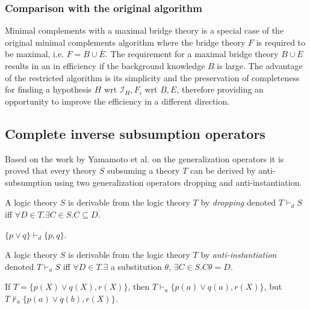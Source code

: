 \subsubsection{Comparison with the original algorithm}\label{inverse_subsumption_algorithm_comparison}
Minimal complements with a maximal bridge theory is a special case of the original minimal complements algorithm where the bridge theory $F$ is required to be maximal, i.e. $F=B \cup \overline{E}$. The requirement for a maximal bridge theory $B \cup \overline{E}$ results in an in efficiency if the background knowledge $B$ is large. The advantage of the restricted algorithm is its simplicity and the preservation of completeness for finding a hypothesis $H$ wrt $\mathcal{I}_H, F_i$ wrt $B,E$, therefore providing an opportunity to improve the efficiency in a different direction.

\subsection{Complete inverse subsumption operators}\label{complete_inverse_subsumption_operators}
Based on the work by Yamamoto et al. on the generalization operators\cite{yamamoto2008towards} it is proved that every theory $S$ subsuming a theory $T$ can be derived by anti-subsumption using two generalization operators dropping and anti-instantiation.

\begin{defn}
A logic theory $S$ is derivable from the logic theory $T$ by \emph{dropping} denoted $T \vdash_d S$ iff
$\forall D \in T. \exists C \in S. C \subseteq D$.
\end{defn}

\begin{exmp}
$\{p \lor q\} \vdash_d \{p, q\}$.
\end{exmp}

\begin{defn}
A logic theory $S$ is derivable from the logic theory $T$ by \emph{anti-instantiation} denoted $T \vdash_a S$ iff
$\forall D \in T. \exists$ a substitution $\theta$, $\exists C \in S. C\theta = D$.
\end{defn}

\begin{exmp}
If $T=\{p(X) \lor q(X), r(X)\}$, then $T\vdash_a\{p(a) \lor q(a), r(X)\}$,
but $T\not\vdash_a\{p(a) \lor q(b), r(X)\}$.
\end{exmp}


